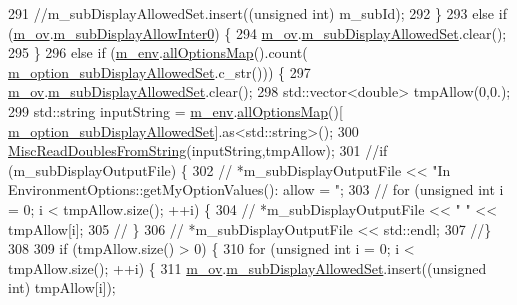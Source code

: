 \begin{DoxyCode}
291     \textcolor{comment}{//m\_subDisplayAllowedSet.insert((unsigned int) m\_subId);}
292   \}
293   \textcolor{keywordflow}{else} \textcolor{keywordflow}{if} (\hyperlink{class_q_u_e_s_o_1_1_environment_options_a97de0e8029b2d567643ab2b1b6ba2b9c}{m\_ov}.\hyperlink{class_q_u_e_s_o_1_1_env_options_values_ae7b34ee974716034ae21a2c39891b8c3}{m\_subDisplayAllowInter0}) \{
294     \hyperlink{class_q_u_e_s_o_1_1_environment_options_a97de0e8029b2d567643ab2b1b6ba2b9c}{m\_ov}.\hyperlink{class_q_u_e_s_o_1_1_env_options_values_afd2f167d8f568df84b3efe5df4430ee3}{m\_subDisplayAllowedSet}.clear();
295   \}
296   \textcolor{keywordflow}{else} \textcolor{keywordflow}{if} (\hyperlink{class_q_u_e_s_o_1_1_environment_options_afe57e2cd6bb9e71df65fe6d133371478}{m\_env}.\hyperlink{class_q_u_e_s_o_1_1_base_environment_ae7cee155956e0e70112f45e2ad1f02c8}{allOptionsMap}().count(
      \hyperlink{class_q_u_e_s_o_1_1_environment_options_aaf46a8974310e00a7569c004736a0f2b}{m\_option\_subDisplayAllowedSet}.c\_str())) \{
297     \hyperlink{class_q_u_e_s_o_1_1_environment_options_a97de0e8029b2d567643ab2b1b6ba2b9c}{m\_ov}.\hyperlink{class_q_u_e_s_o_1_1_env_options_values_afd2f167d8f568df84b3efe5df4430ee3}{m\_subDisplayAllowedSet}.clear();
298     std::vector<double> tmpAllow(0,0.);
299     std::string inputString = \hyperlink{class_q_u_e_s_o_1_1_environment_options_afe57e2cd6bb9e71df65fe6d133371478}{m\_env}.\hyperlink{class_q_u_e_s_o_1_1_base_environment_ae7cee155956e0e70112f45e2ad1f02c8}{allOptionsMap}()[
      \hyperlink{class_q_u_e_s_o_1_1_environment_options_aaf46a8974310e00a7569c004736a0f2b}{m\_option\_subDisplayAllowedSet}].as<std::string>();
300     \hyperlink{namespace_q_u_e_s_o_ac3fab438679d1dc864f8d629881dad2e}{MiscReadDoublesFromString}(inputString,tmpAllow);
301     \textcolor{comment}{//if (m\_subDisplayOutputFile) \{}
302     \textcolor{comment}{//  *m\_subDisplayOutputFile << "In EnvironmentOptions::getMyOptionValues(): allow = ";}
303     \textcolor{comment}{//  for (unsigned int i = 0; i < tmpAllow.size(); ++i) \{}
304     \textcolor{comment}{//    *m\_subDisplayOutputFile << " " << tmpAllow[i];}
305     \textcolor{comment}{//  \}}
306     \textcolor{comment}{//  *m\_subDisplayOutputFile << std::endl;}
307     \textcolor{comment}{//\}}
308 
309     \textcolor{keywordflow}{if} (tmpAllow.size() > 0) \{
310       \textcolor{keywordflow}{for} (\textcolor{keywordtype}{unsigned} \textcolor{keywordtype}{int} i = 0; i < tmpAllow.size(); ++i) \{
311         \hyperlink{class_q_u_e_s_o_1_1_environment_options_a97de0e8029b2d567643ab2b1b6ba2b9c}{m\_ov}.\hyperlink{class_q_u_e_s_o_1_1_env_options_values_afd2f167d8f568df84b3efe5df4430ee3}{m\_subDisplayAllowedSet}.insert((\textcolor{keywordtype}{unsigned} \textcolor{keywordtype}{int}) tmpAllow[i]);

\end{DoxyCode}

